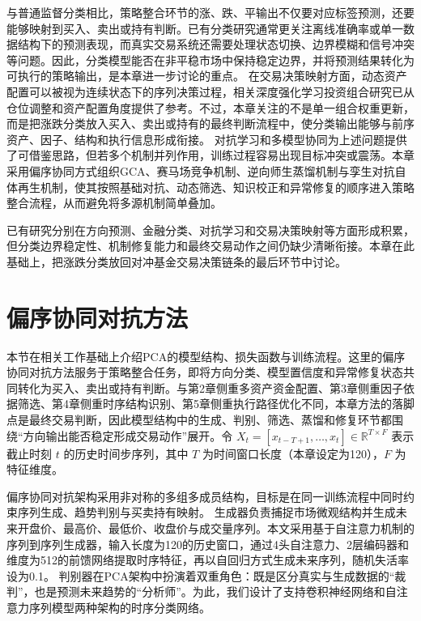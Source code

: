 与普通监督分类相比，策略整合环节的涨、跌、平输出不仅要对应标签预测，还要能够映射到买入、卖出或持有判断。已有分类研究通常更关注离线准确率或单一数据结构下的预测表现，而真实交易系统还需要处理状态切换、边界模糊和信号冲突等问题。因此，分类模型能否在非平稳市场中保持稳定边界，并将预测结果转化为可执行的策略输出，是本章进一步讨论的重点。
在交易决策映射方面，动态资产配置可以被视为连续状态下的序列决策过程，相关深度强化学习投资组合研究已从仓位调整和资产配置角度提供了参考\cite{xiao2025research}。不过，本章关注的不是单一组合权重更新，而是把涨跌分类放入买入、卖出或持有的最终判断流程中，使分类输出能够与前序资产、因子、结构和执行信息形成衔接。
对抗学习和多模型协同为上述问题提供了可借鉴思路，但若多个机制并列作用，训练过程容易出现目标冲突或震荡。本章采用偏序协同方式组织GCA、赛马场竞争机制、逆向师生蒸馏机制与孪生对抗自体再生机制，使其按照基础对抗、动态筛选、知识校正和异常修复的顺序进入策略整合流程，从而避免将多源机制简单叠加。

已有研究分别在方向预测、金融分类、对抗学习和交易决策映射等方面形成积累，但分类边界稳定性、机制修复能力和最终交易动作之间仍缺少清晰衔接。本章在此基础上，把涨跌分类放回对冲基金交易决策链条的最后环节中讨论。


\section{偏序协同对抗方法}

本节在相关工作基础上介绍PCA的模型结构、损失函数与训练流程。这里的偏序协同对抗方法服务于策略整合任务，即将方向分类、模型置信度和异常修复状态共同转化为买入、卖出或持有判断。与第2章侧重多资产资金配置、第3章侧重因子依据筛选、第4章侧重时序结构识别、第5章侧重执行路径优化不同，本章方法的落脚点是最终交易判断，因此模型结构中的生成、判别、筛选、蒸馏和修复环节都围绕“方向输出能否稳定形成交易动作”展开。令 $X_t = [x_{t-T+1}, \dots, x_t] \in \mathbb{R}^{T \times F}$ 表示截止时刻 $t$ 的历史时间步序列，其中 $T$ 为时间窗口长度（本章设定为120），$F$ 为特征维度。

偏序协同对抗架构采用非对称的多组多成员结构，目标是在同一训练流程中同时约束序列生成、趋势判别与买卖持有映射。
生成器负责捕捉市场微观结构并生成未来开盘价、最高价、最低价、收盘价与成交量序列。本文采用基于自注意力机制的序列到序列生成器，输入长度为120的历史窗口，通过4头自注意力、2层编码器和维度为512的前馈网络提取时序特征，再以自回归方式生成未来序列，随机失活率设为0.1。
判别器在PCA架构中扮演着双重角色：既是区分真实与生成数据的“裁判”，也是预测未来趋势的“分析师”。为此，我们设计了支持卷积神经网络和自注意力序列模型两种架构的时序分类网络。

